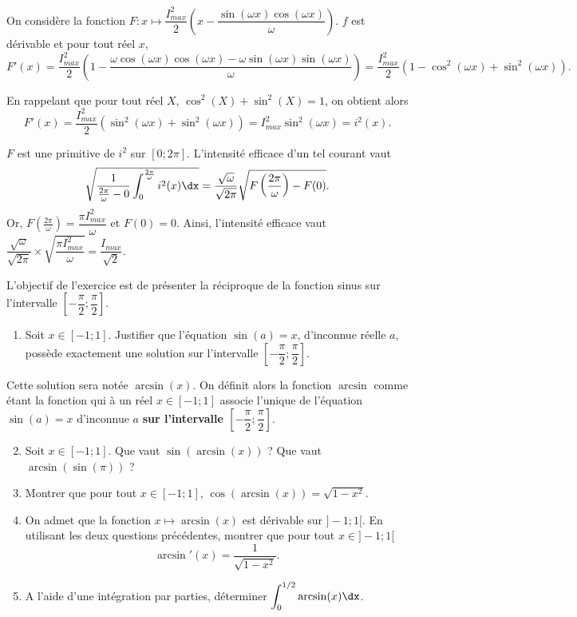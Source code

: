 \documentclass[11pt,fleqn, openany]{book} %
\begin{document}
\begin{solution}
On considère la fonction $F:x\mapsto \dfrac{I_{max}^2}{2}\left(x-\dfrac{\sin(\omega x)\cos(\omega x)}{\omega}\right)$. $f$ est dérivable et pour tout réel $x$, 
\[F'(x)=\dfrac{I_{max}^2}{2}\left(1-\dfrac{\omega \cos(\omega x) \cos (\omega x)- \omega \sin( \omega x) \sin (\omega x)}{\omega}\right)=\dfrac{I_{max}^2}{2}\left(1-\cos^2(\omega x)+\sin^2(\omega x)\right).\]

En rappelant que pour tout réel $X$, $\cos^2(X)+\sin^2(X)=1$, on obtient alors
\[ F'(x) = \dfrac{I_{max}^2}{2}(\sin^2(\omega x)+\sin^2(\omega x))=I_{max}^2\sin^2(\omega x)=i^2(x).\]

$F$ est une primitive de $i^2$ sur $[0;2\pi]$. L'intensité efficace d'un tel courant vaut
\[ \sqrt{ \dfrac{1}{\frac{2\pi}{\omega}-0}\int_{0}^{\frac{2\pi}{\omega}} i^2(x)\dx} = \dfrac{\sqrt{\omega}}{\sqrt{2\pi}}\sqrt{F\left(\frac{2\pi}{\omega}\right)-F(0)}.\]
Or, $F\left(\frac{2\pi}{\omega}\right)=\dfrac{\pi I_{max}^2}{\omega}$ et $F(0)=0$. Ainsi, l'intensité efficace vaut $\dfrac{\sqrt{\omega}}{\sqrt {2\pi}} \times \sqrt{\dfrac{\pi I_{max}^2}{\omega}}=\dfrac{I_{max}}{\sqrt{2}}$.
 \end{solution}
 
 

\begin{exercise}[topic=trig03, subtitle={(Fonction arcsinus)}]

L'objectif de l'exercice est de présenter la réciproque de la fonction sinus sur l'intervalle $\left[-\dfrac{\pi}{2};\dfrac{\pi}{2}\right]$.

\begin{enumerate}
\item Soit $x\in [-1;1]$. Justifier que l'équation $\sin(a)=x$, d'inconnue réelle $a$, possède exactement une solution sur l'intervalle $\left[-\dfrac{\pi}{2};\dfrac{\pi}{2}\right]$. 
\end{enumerate}
Cette solution sera notée $\arcsin (x)$. On définit alors la fonction $\arcsin$ comme étant la fonction qui à un réel $x\in[-1;1]$ associe l'unique de l'équation $\sin(a)=x$ d'inconnue $a$ \textbf{sur l'intervalle $\left[-\dfrac{\pi}{2};\dfrac{\pi}{2}\right]$}.
\vskip10pt
\begin{enumerate}
\setcounter{enumi}{1}
\item Soit $x\in [-1;1]$. Que vaut $\sin(\arcsin(x))$ ? Que vaut $\arcsin(\sin(\pi))$ ?
\vskip10pt
\item Montrer que pour tout $x\in[-1;1]$, $\cos(\arcsin(x))=\sqrt{1-x^2}$.
\vskip10pt
\item On admet que la fonction $x\mapsto \arcsin (x)$ est dérivable sur $]-1;1[$. En utilisant les deux questions précédentes, montrer que pour tout $x\in ]-1;1[$
\[\arcsin'(x)=\dfrac{1}{\sqrt{1-x^2}}.\]
\item A l'aide d'une intégration par parties, déterminer $\displaystyle\int_0^{1/2} \arcsin(x) \dx$.
\end{enumerate}
\end{exercise}
\end{document}
